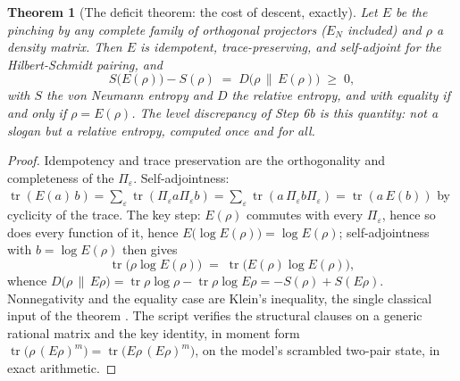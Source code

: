 \documentclass[11pt]{article}
\newtheorem{theorem}{Theorem}[section]
\theoremstyle{definition}
\theoremstyle{plain}
\providecommand{\EN}{}\renewcommand{\EN}{E_{N}}
\providecommand{\tr}{}\renewcommand{\tr}{\operatorname{tr}}
\providecommand{\rel}{}\renewcommand{\rel}[2]{D\bigl(#1 \,\|\, #2\bigr)}
\begin{document}
\begin{theorem}[The deficit theorem: the cost of descent, exactly]\label{c:singularity.deficit-theorem-cost-descent-exactly}
Let $E$ be the pinching by any complete family of orthogonal projectors ($\EN$ included) and $\rho$ a density matrix. Then $E$ is idempotent, trace-preserving, and self-adjoint for the Hilbert-Schmidt pairing, and
\[
S\bigl(E(\rho)\bigr) - S(\rho) \;=\; \rel{\rho}{E(\rho)} \;\geq\; 0 ,
\]
with $S$ the von Neumann entropy and $D$ the relative entropy, and with equality if and only if $\rho = E(\rho)$. The level discrepancy of Step 6b is this quantity: not a slogan but a relative entropy, computed once and for all.
\end{theorem}
\begin{proof}
Idempotency and trace preservation are the orthogonality and completeness of the $\Pi_\varepsilon$. Self-adjointness: $\tr(E(a)\,b) = \sum_\varepsilon \tr(\Pi_\varepsilon a \Pi_\varepsilon b) = \sum_\varepsilon \tr(a\, \Pi_\varepsilon b \Pi_\varepsilon) = \tr(a\,E(b))$ by cyclicity of the trace. The key step: $E(\rho)$ commutes with every $\Pi_\varepsilon$, hence so does every function of it, hence $E\bigl(\log E(\rho)\bigr) = \log E(\rho)$; self-adjointness with $b = \log E(\rho)$ then gives
\[
\tr\bigl(\rho \log E(\rho)\bigr) \;=\; \tr\bigl(E(\rho) \log E(\rho)\bigr) ,
\]
whence $\rel{\rho}{E\rho} = \tr\rho\log\rho - \tr\rho\log E\rho = -S(\rho) + S(E\rho)$. Nonnegativity and the equality case are Klein's inequality, the single classical input of the theorem \cite[\S 11.3]{NielsenChuang}. The script verifies the structural clauses on a generic rational matrix and the key identity, in moment form $\tr\bigl(\rho\,(E\rho)^m\bigr) = \tr\bigl(E\rho\,(E\rho)^m\bigr)$, on the model's scrambled two-pair state, in exact arithmetic.

\end{proof}
\end{document}
